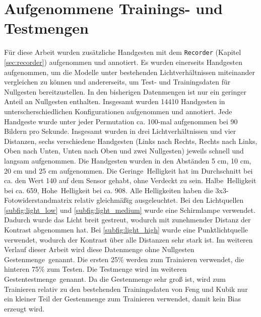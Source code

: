 \section{Aufgenommene Trainings- und Testmengen}
\label{sec:DymelData}
Für diese Arbeit wurden zusätzliche Handgesten mit dem \texttt{Recorder} (Kapitel \ref{sec:recorder}) aufgenommen und annotiert. Es wurden einerseits Handgesten aufgenommen, um die Modelle unter
bestehenden Lichtverhältnissen miteinander vergleichen zu können und andererseits, um Test- und Trainingsdaten für Nullgesten bereitzustellen. In den
bisherigen Datenmengen ist nur ein geringer Anteil an Nullgesten enthalten. Insgesamt wurden 14410 Handgesten in unterscherschiedlichen Konfigurationen aufgenommen und annotiert.
\newline
\newline
Jede Handgeste wurde unter jeder Permutation ca. 100-mal aufgenommen bei 90 Bildern pro Sekunde. Insgesamt wurden in drei Lichtverhältnissen und vier Distanzen, sechs verschiedene Handgesten (Links nach Rechts,
Rechts nach Links, Oben nach Unten, Unten nach Oben und zwei Nullgesten) jeweils schnell und langsam aufgenommen. Die Handgesten wurden in den Abständen 5 cm, 10 cm, 20 cm und 25 cm aufgenommen.
\newline
\newline
Die \glqq Geringe\grqq\ Helligkeit hat im Durchschnitt bei ca. den Wert 140 auf dem Sensor gehabt, ohne Verdeckt zu sein. \glqq Halbe\grqq\ Helligkeit bei ca. 659, \glqq Hohe\grqq\ Helligkeit bei
ca. 908. Alle Helligkeiten haben die 3x3-Fotowiderstandmatrix
relativ gleichmäßig ausgeleuchtet. Bei den Lichtquellen \ref{subfig:light_low} und \ref{subfig:light_medium} wurde eine Schirmlampe verwendet. Dadurch wurde das Licht breit gestreut,
wodurch mit zunehmender Distanz der Kontrast abgenommen hat. Bei \ref{subfig:light_high} wurde eine Punktlichtquelle verwendet, wodurch der Kontrast über alle Distanzen sehr stark ist.
Im weiteren Verlauf dieser Arbeit wird diese Datenmenge ohne Nullgesten \glqq Gestenmenge\grqq\ genannt. Die ersten 25\% werden zum Trainieren verwendet, die hinteren 75\% zum Testen. Die Testmenge
wird im weiteren \glqq Gestentestmenge\grqq\ genannt. Da die Gestenmenge sehr groß ist, wird zum Trainieren relativ zu den bestehenden Trainingsdaten von Feng und Kubik nur ein kleiner Teil der
Gestenmenge zum Trainieren verwendet, damit kein Bias erzeugt wird.
\newline
\newline
